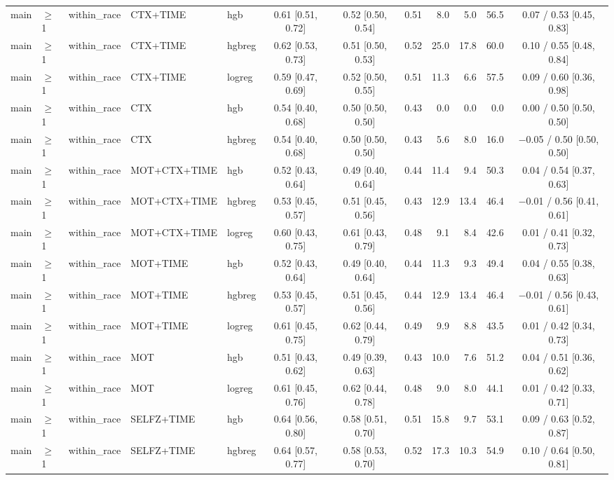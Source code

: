 \begin{longtable}{@{}lllllcccrrrc@{}}
main & $\geq$1 & within\_race & CTX+TIME & hgb & 0.61 [0.51, 0.72] & 0.52 [0.50, 0.54] & 0.51 & 8.0 & 5.0 & 56.5 & 0.07 / 0.53 [0.45, 0.83] \\
main & $\geq$1 & within\_race & CTX+TIME & hgbreg & 0.62 [0.53, 0.73] & 0.51 [0.50, 0.53] & 0.52 & 25.0 & 17.8 & 60.0 & 0.10 / 0.55 [0.48, 0.84] \\
main & $\geq$1 & within\_race & CTX+TIME & logreg & 0.59 [0.47, 0.69] & 0.52 [0.50, 0.55] & 0.51 & 11.3 & 6.6 & 57.5 & 0.09 / 0.60 [0.36, 0.98] \\
main & $\geq$1 & within\_race & CTX & hgb & 0.54 [0.40, 0.68] & 0.50 [0.50, 0.50] & 0.43 & 0.0 & 0.0 & 0.0 & 0.00 / 0.50 [0.50, 0.50] \\
main & $\geq$1 & within\_race & CTX & hgbreg & 0.54 [0.40, 0.68] & 0.50 [0.50, 0.50] & 0.43 & 5.6 & 8.0 & 16.0 & $-$0.05 / 0.50 [0.50, 0.50] \\
main & $\geq$1 & within\_race & MOT+CTX+TIME & hgb & 0.52 [0.43, 0.64] & 0.49 [0.40, 0.64] & 0.44 & 11.4 & 9.4 & 50.3 & 0.04 / 0.54 [0.37, 0.63] \\
main & $\geq$1 & within\_race & MOT+CTX+TIME & hgbreg & 0.53 [0.45, 0.57] & 0.51 [0.45, 0.56] & 0.43 & 12.9 & 13.4 & 46.4 & $-$0.01 / 0.56 [0.41, 0.61] \\
main & $\geq$1 & within\_race & MOT+CTX+TIME & logreg & 0.60 [0.43, 0.75] & 0.61 [0.43, 0.79] & 0.48 & 9.1 & 8.4 & 42.6 & 0.01 / 0.41 [0.32, 0.73] \\
main & $\geq$1 & within\_race & MOT+TIME & hgb & 0.52 [0.43, 0.64] & 0.49 [0.40, 0.64] & 0.44 & 11.3 & 9.3 & 49.4 & 0.04 / 0.55 [0.38, 0.63] \\
main & $\geq$1 & within\_race & MOT+TIME & hgbreg & 0.53 [0.45, 0.57] & 0.51 [0.45, 0.56] & 0.44 & 12.9 & 13.4 & 46.4 & $-$0.01 / 0.56 [0.43, 0.61] \\
main & $\geq$1 & within\_race & MOT+TIME & logreg & 0.61 [0.45, 0.75] & 0.62 [0.44, 0.79] & 0.49 & 9.9 & 8.8 & 43.5 & 0.01 / 0.42 [0.34, 0.73] \\
main & $\geq$1 & within\_race & MOT & hgb & 0.51 [0.43, 0.62] & 0.49 [0.39, 0.63] & 0.43 & 10.0 & 7.6 & 51.2 & 0.04 / 0.51 [0.36, 0.62] \\
main & $\geq$1 & within\_race & MOT & logreg & 0.61 [0.45, 0.76] & 0.62 [0.44, 0.78] & 0.48 & 9.0 & 8.0 & 44.1 & 0.01 / 0.42 [0.33, 0.71] \\
main & $\geq$1 & within\_race & SELFZ+TIME & hgb & 0.64 [0.56, 0.80] & 0.58 [0.51, 0.70] & 0.51 & 15.8 & 9.7 & 53.1 & 0.09 / 0.63 [0.52, 0.87] \\
main & $\geq$1 & within\_race & SELFZ+TIME & hgbreg & 0.64 [0.57, 0.77] & 0.58 [0.53, 0.70] & 0.52 & 17.3 & 10.3 & 54.9 & 0.10 / 0.64 [0.50, 0.81] \\

\end{longtable}
